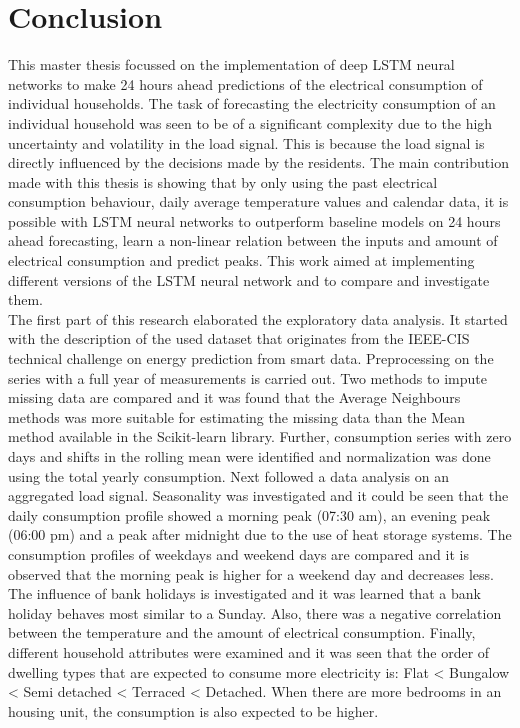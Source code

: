 \chapter*{Conclusion}
\label{cha:conclusion}
This master thesis focussed on the implementation of deep LSTM neural networks to make 24 hours ahead predictions of the electrical consumption of individual households. The task of forecasting the electricity consumption of an individual household was seen to be of a significant complexity due to the high uncertainty and volatility in the load signal. This is because the load signal is directly influenced by the decisions made by the residents. The main contribution made with this thesis is showing that by only using the past electrical consumption behaviour, daily average temperature values and calendar data, it is possible with LSTM neural networks to outperform baseline models on 24 hours ahead forecasting, learn a non-linear relation between the inputs and amount of electrical consumption and predict peaks. This work aimed at implementing different versions of the LSTM neural network and to compare and investigate them.\\

The first part of this research elaborated the exploratory data analysis. It started with the description of the used dataset that originates from the IEEE-CIS technical challenge on energy prediction from smart data. Preprocessing on the series with a full year of measurements is carried out. Two methods to impute missing data are compared and it was found that the Average Neighbours methods was more suitable for estimating the missing data than the Mean method available in the Scikit-learn library. Further, consumption series with zero days and shifts in the rolling mean were identified and normalization was done using the total yearly consumption. Next followed a data analysis on an aggregated load signal. Seasonality was investigated and it could be seen that the daily consumption profile showed a morning peak (07:30 am), an evening peak (06:00 pm) and a peak after midnight due to the use of heat storage systems. The consumption profiles of weekdays and weekend days are compared and it is observed that the morning peak is higher for a weekend day and decreases less. The influence of bank holidays is investigated and it was learned that a bank holiday behaves most similar to a Sunday. Also, there was a negative correlation between the temperature and the amount of electrical consumption. Finally, different household attributes were examined and it was seen that the order of dwelling types that are expected to consume more electricity is: Flat < Bungalow < Semi detached < Terraced < Detached. When there are more bedrooms in an housing unit, the consumption is also expected to be higher. \\ 

